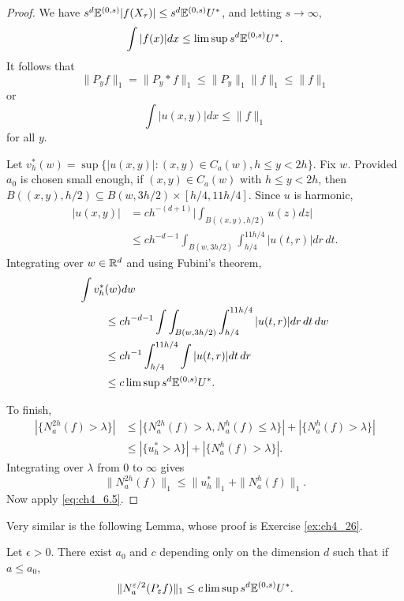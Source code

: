 \begin{proof}
We have $s^d\mathbb{E}^{(0,s)}|f(X_\tau)| \leq s^d\mathbb{E}^{(0,s)}U^*$, and letting $s \to \infty$,
\begin{equation}\label{eq:ch4_6.3}
    \int |f(x)|dx \leq \limsup s^d\mathbb{E}^{(0,s)}U^*.
\end{equation}
It follows that
\begin{equation}\label{eq:ch4_6.4}
    \|P_y f\|_1 = \|P_y * f\|_1 \leq \|P_y\|_1\|f\|_1 \leq \|f\|_1
\end{equation}
or
\[
    \int |u(x,y)|dx \leq \|f\|_1
\]
for all $y$.

Let $v_h^*(w) = \sup\{|u(x,y)| : (x,y) \in C_a(w), h \leq y < 2h\}$. Fix $w$. Provided $a_0$ is chosen small enough, if $(x,y) \in C_a(w)$ with $h \leq y < 2h$, then $B((x,y),h/2) \subseteq B(w,3h/2) \times [h/4,11h/4]$. Since $u$ is harmonic,
\begin{align*}
    |u(x,y)| &= ch^{-(d+1)}\Big|\int_{B((x,y),h/2)} u(z)dz\Big| \\
    &\leq ch^{-d-1}\int_{B(w,3h/2)}\int_{h/4}^{11h/4} |u(t,r)|dr\,dt.
\end{align*}
Integrating over $w \in \mathbb{R}^d$ and using Fubini's theorem,
\begin{align}\label{eq:ch4_6.5}
    \int v_h^*&(w)dw \\
    &\leq ch^{-d-1}\int\int_{B(w,3h/2)}\int_{h/4}^{11h/4} |u(t,r)|dr\,dt\,dw \notag \\
    &\leq ch^{-1}\int_{h/4}^{11h/4}\int |u(t,r)|dt\,dr \notag \\
    &\leq c\limsup s^d\mathbb{E}^{(0,s)}U^*. \notag
\end{align}

To finish,
\begin{align*}
    |\{N_a^{2h}(f) > \lambda\}| &\leq |\{N_a^{2h}(f) > \lambda, N_a^h(f) \leq \lambda\}| + |\{N_a^h(f) > \lambda\}| \\
    &\leq |\{u_h^* > \lambda\}| + |\{N_a^h(f) > \lambda\}|.
\end{align*}
Integrating over $\lambda$ from $0$ to $\infty$ gives
\[
    \|N_a^{2h}(f)\|_1 \leq \|u_h^*\|_1 + \|N_a^h(f)\|_1.
\]
Now apply \eqref{eq:ch4_6.5}.
\end{proof}

Very similar is the following Lemma, whose proof is Exercise \ref{ex:ch4_26}.

\begin{lemma}\label{lem:ch4_6.7}
Let $\epsilon > 0$. There exist $a_0$ and $c$ depending only on the dimension $d$ such that if $a \leq a_0$,
\[
    \|N_a^{\varepsilon/2}(P_{\varepsilon}f)\|_1 \leq c\limsup s^d\mathbb{E}^{(0,s)}U^*.
\]
\end{lemma}

